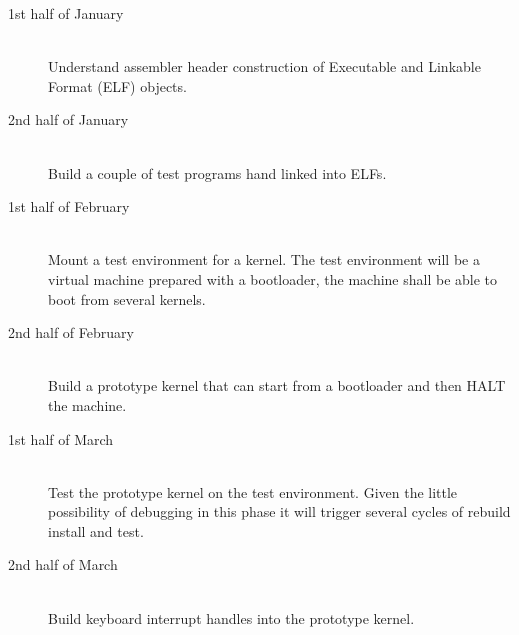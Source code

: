 \documentclass[11pt,a4paper,twoside,openright]{report}
\begin{document}
\begin{description}
\item[1st half of January] \hfill \\
Understand assembler header construction of Executable and Linkable Format
(ELF) objects.

\item[2nd half of January] \hfill \\
Build a couple of test programs hand linked into ELFs.

\item[1st half of February] \hfill \\
Mount a test environment for a kernel.  The test environment will be a virtual
machine prepared with a bootloader, the machine shall be able to boot from
several kernels.

\item[2nd half of February] \hfill \\
Build a prototype kernel that can start from a bootloader and then HALT the
machine.

\item[1st half of March] \hfill \\
Test the prototype kernel on the test environment.  Given the little
possibility of debugging in this phase it will trigger several cycles of
rebuild install and test.

\item[2nd half of March] \hfill \\
Build keyboard interrupt handles into the prototype kernel.
\end{description}
\end{document}
